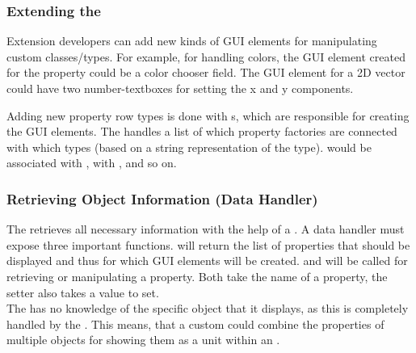\subsubsection{Extending the }

Extension developers can add new kinds of GUI elements for manipulating custom classes/types. For example, for handling colors, the GUI element created for the property could be a color chooser field. The GUI element for a 2D vector could have two number-textboxes for setting the x and y components. 

Adding new property row types is done with s, which are responsible for creating the GUI elements. The  handles a list of which property factories are connected with which types (based on a string representation of the  type).  would be associated \linebreak with ,  with , and so on. 

\subsubsection{Retrieving Object Information (Data Handler)}

The  retrieves all necessary information with the help of a . A data handler must expose three important functions.  will return the list of properties that should be displayed and thus for which GUI elements will be created.  and  will be called for retrieving or manipulating a property. Both take the name of a property, the setter also takes a value to set.\\
The  has no knowledge of the specific  object that it displays, as this is completely handled by the . This means, that a custom  could combine the properties of multiple objects for showing them as a unit within an .

